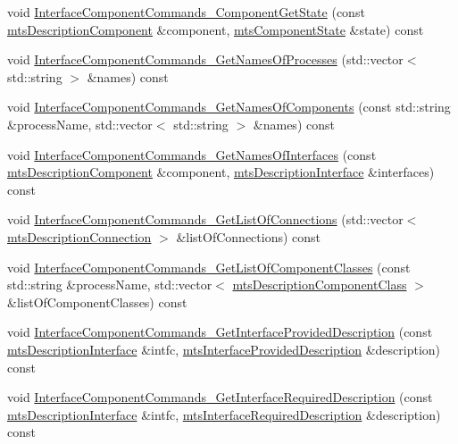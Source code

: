 \begin{DoxyCompactItemize}
\item 
void \hyperlink{classmts_manager_component_client_a71563477c115e8e5e09fd70e989a60db}{Interface\+Component\+Commands\+\_\+\+Component\+Get\+State} (const \hyperlink{classmts_description_component}{mts\+Description\+Component} \&component, \hyperlink{classmts_component_state}{mts\+Component\+State} \&state) const 
\item 
void \hyperlink{classmts_manager_component_client_a9f58399384c52a9fa6c05a3533467a4c}{Interface\+Component\+Commands\+\_\+\+Get\+Names\+Of\+Processes} (std\+::vector$<$ std\+::string $>$ \&names) const 
\item 
void \hyperlink{classmts_manager_component_client_adb5405af61fdc8d9689cf63bb6090a34}{Interface\+Component\+Commands\+\_\+\+Get\+Names\+Of\+Components} (const std\+::string \&process\+Name, std\+::vector$<$ std\+::string $>$ \&names) const 
\item 
void \hyperlink{classmts_manager_component_client_a9f3d21786d18f9c41edb3432bc9326cb}{Interface\+Component\+Commands\+\_\+\+Get\+Names\+Of\+Interfaces} (const \hyperlink{classmts_description_component}{mts\+Description\+Component} \&component, \hyperlink{classmts_description_interface}{mts\+Description\+Interface} \&interfaces) const 
\item 
void \hyperlink{classmts_manager_component_client_a551017574e04ac9cc7eb2f0430ba573e}{Interface\+Component\+Commands\+\_\+\+Get\+List\+Of\+Connections} (std\+::vector$<$ \hyperlink{classmts_description_connection}{mts\+Description\+Connection} $>$ \&list\+Of\+Connections) const 
\item 
void \hyperlink{classmts_manager_component_client_a84f16e0e7370e527e27b3e5ffc70d939}{Interface\+Component\+Commands\+\_\+\+Get\+List\+Of\+Component\+Classes} (const std\+::string \&process\+Name, std\+::vector$<$ \hyperlink{classmts_description_component_class}{mts\+Description\+Component\+Class} $>$ \&list\+Of\+Component\+Classes) const 
\item 
void \hyperlink{classmts_manager_component_client_a824e945df9294a5f0d2232bac4e94d22}{Interface\+Component\+Commands\+\_\+\+Get\+Interface\+Provided\+Description} (const \hyperlink{classmts_description_interface}{mts\+Description\+Interface} \&intfc, \hyperlink{classmts_interface_provided_description}{mts\+Interface\+Provided\+Description} \&description) const 
\item 
void \hyperlink{classmts_manager_component_client_ad50e56091dc851539a7e8fc476c0a4f2}{Interface\+Component\+Commands\+\_\+\+Get\+Interface\+Required\+Description} (const \hyperlink{classmts_description_interface}{mts\+Description\+Interface} \&intfc, \hyperlink{classmts_interface_required_description}{mts\+Interface\+Required\+Description} \&description) const 

\end{DoxyCompactItemize}
